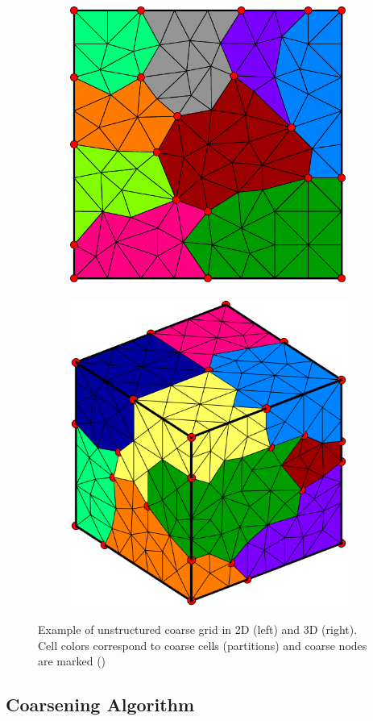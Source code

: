 \begin{figure}[htbp]
  \begin{subfigure}[t]{0.5\textwidth}
    \centerline{\includegraphics[width=0.6\linewidth]{figs/square_tria_coarse}}
  \end{subfigure}
  \begin{subfigure}[t]{0.5\textwidth}
    \centerline{\includegraphics[width=0.6\linewidth]{figs/cube_tetra_coarse}}
  \end{subfigure}
  \caption[Unstructured coarse grid examples]{\label{fig:square_coarse} Example of unstructured coarse grid in 2D (left) and 3D (right). Cell colors correspond to coarse cells (partitions) and coarse nodes are marked ()}
\end{figure}

\subsection{Coarsening Algorithm}
\label{subsec:msrsb_coarsening_algorithm}

